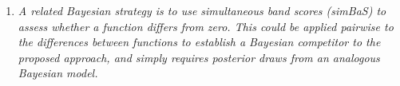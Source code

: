 \documentclass[a4paper,12pt]{article}
\begin{document}
\begin{enumerate}[label=\arabic*.,leftmargin=0.6cm]



  

\item \textit{A related Bayesian strategy is to use simultaneous band scores (simBaS) to assess whether a function differs from zero. This could be applied pairwise to the differences between functions to establish a Bayesian competitor to the proposed approach, and simply requires posterior draws from an analogous Bayesian model.}


\end{enumerate}
\end{document}
